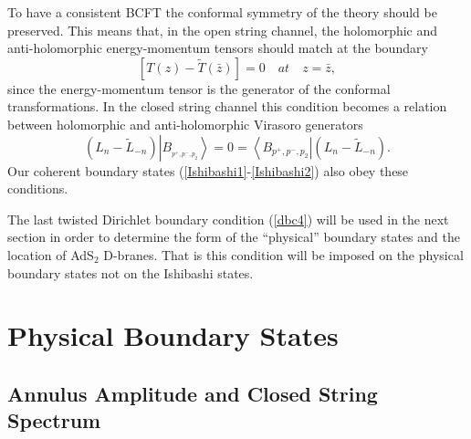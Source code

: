 \documentclass[a4paper,12pt]{article}
\begin{document}
To have a consistent BCFT the conformal symmetry of the theory should be
preserved. This means that, in the open string channel, the holomorphic and
anti-holomorphic energy-momentum tensors should match at the boundary
\begin{equation}
\left[ T\left( z\right) -\tilde{T}\left( \bar{z}\right) \right] =0\quad
at\quad z=\bar{z},  \label{TTbar}
\end{equation}
since the energy-momentum tensor is the generator of the conformal
transformations. In the closed string channel this condition becomes a
relation between holomorphic and anti-holomorphic Virasoro generators
\begin{equation}
(L_{n}-\tilde{L}_{-n})\left| B_{_{p^{+},p^{-},p_{2}}}\right\rangle
=0=\left\langle B_{p^{+},p^{-},p_{2}}\right| (L_{n}-\tilde{L}_{-n}).
\label{confsym}
\end{equation}
Our coherent boundary states (\ref{Ishibashi1}-\ref{Ishibashi2}) also obey
these conditions.

The last twisted Dirichlet boundary condition (\ref{dbc4}) will be used in
the next section in order to determine the form of the ``physical'' boundary
states and the location of AdS$_{2}$ D-branes. That is this condition will
be imposed on the physical boundary states not on the Ishibashi states.

\section{Physical Boundary States}

\subsection{Annulus Amplitude and Closed String Spectrum}
\end{document}
